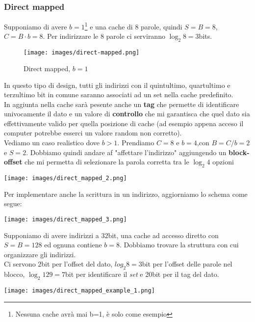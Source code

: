 \subsubsection{Direct mapped}
Supponiamo di avere $b=1$\footnote{Nessuna cache avrà mai b=1, è solo come esempio} e una cache di 8 parole, quindi $S=B=8$, $C=B\cdot b=8$. Per indirizzare le 8 parole ci serviranno $\log_2 8 = 3$bits.\\

\begin{wrapfigure}{r}{6.5cm}
	\centering
	\texttt{[image: images/direct-mapped.png]}
	\caption{Direct mapped, $b=1$}
\end{wrapfigure}

In questo tipo di design, tutti gli indirizzi con il quintultimo, quartultimo e terzultimo bit in comune saranno associati ad un set nella cache predefinito. \\
In aggiunta nella cache sarà pesente anche un \textbf{tag} che permette di identificare univocamente il dato e un valore di \textbf{controllo} che mi garantisca che quel dato sia effettivamente valido per quella posizione di cache (ad esempio appena acceso il computer potrebbe esserci un valore random non corretto).\\

\noindent Vediamo un caso realistico dove \(b > 1\). Prendiamo $C = 8$ e $b = 4$,con $B = C/b = 2$ e $S = 2$. Dobbiamo quindi andare af "affettare l'indirizzo" aggiungendo un \textbf{block-offset} che mi permetta di selezionare la parola corretta tra le $\log_2 4$ opzioni
\begin{center}
	\texttt{[image: images/direct\_mapped\_2.png]}
\end{center}

\noindent Per implementare anche la scrittura in un indirizzo, aggiorniamo lo schema come segue:
\begin{center}
	\texttt{[image: images/direct\_mapped\_3.png]}
\end{center}

\begin{example}
	\label{example:direct_access_1}
    Supponiamo di avere indirizzi a $32$bit, una cache ad accesso diretto con $S = B = 128$ ed ognuna contiene $b = 8$. Dobbiamo trovare la struttura con cui organizzare gli indirizzi.\\
    Ci servono $2$bit per l'offset del dato, $log_2 8=3$bit per l'offset delle parole nel blocco, \(\log_2 129 = 7\)bit per identificare il \emph{set} e 20bit per il tag del dato.
    \begin{center}
    	\texttt{[image: images/direct\_mapped\_example\_1.png]}
    \end{center}
\end{example}

